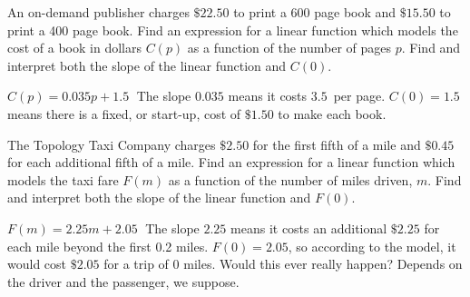 \documentclass{ximera}
\begin{document}
\begin{problem}
An on-demand publisher charges $\$22.50$ to print a 600 page book and $\$15.50$ to print a 400 page book.  Find an expression for a linear function which models the cost of a book in dollars $C(p)$ as a function of the number of pages $p$.  Find and interpret both the slope of the linear function  and $C(0)$.

\begin{solution}
$C(p) = 0.035p + 1.5 \;$  The slope $0.035$ means it costs $3.5$\textcent \, per page.  $C(0) = 1.5$ means there is a fixed, or start-up, cost of $\$1.50$ to make each book.
\end{solution}
\end{problem}

\begin{problem}
The Topology Taxi Company charges $\$2.50$ for the first fifth of a mile and $\$0.45$ for each additional fifth of a mile.  Find an expression for a  linear function which models the taxi fare $F(m)$ as a function of the number of miles driven, $m$.  Find and interpret both the slope of the linear function  and $F(0)$.

\begin{solution}
$F(m) = 2.25m + 2.05 \;$  The slope $2.25$ means it costs an additional $\$2.25$ for each mile beyond the first 0.2 miles.  $F(0) = 2.05$, so according to the model, it would cost $\$2.05$ for a trip of $0$ miles.  Would this ever really happen?  Depends on the driver and the passenger, we suppose.
\end{solution}
\end{problem}
\end{document}
